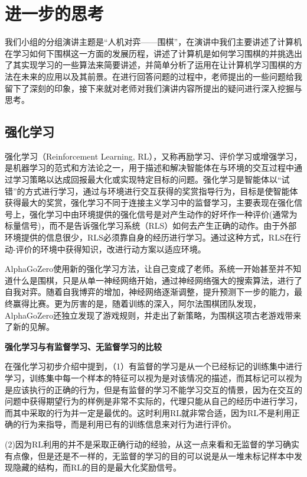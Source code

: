\documentclass{article}
\begin{document}
\section{进一步的思考}
我们小组的分组演讲主题是“人机对弈——围棋”，在演讲中我们主要讲述了计算机在学习如何下围棋这一方面的发展历程，讲述了计算机是如何学习围棋的并挑选出了其实现学习的一些算法来简要讲述，并简单分析了运用在让计算机学习围棋的方法在未来的应用以及其前景。在进行回答问题的过程中，老师提出的一些问题给我留下了深刻的印象，接下来就对老师对我们演讲内容所提出的疑问进行深入挖掘与思考。
\subsection{强化学习}
强化学习（Reinforcement Learning, RL），又称再励学习、评价学习或增强学习，是机器学习的范式和方法论之一，用于描述和解决智能体在与环境的交互过程中通过学习策略以达成回报最大化或实现特定目标的问题。强化学习是智能体以“试错”的方式进行学习，通过与环境进行交互获得的奖赏指导行为，目标是使智能体获得最大的奖赏，强化学习不同于连接主义学习中的监督学习，主要表现在强化信号上，强化学习中由环境提供的强化信号是对产生动作的好坏作一种评价(通常为标量信号)，而不是告诉强化学习系统（RLS）如何去产生正确的动作。由于外部环境提供的信息很少，RLS必须靠自身的经历进行学习。通过这种方式，RLS在行动-评价的环境中获得知识，改进行动方案以适应环境。\par
AlphaGoZero使用新的强化学习方法，让自己变成了老师。系统一开始甚至并不知道什么是围棋，只是从单一神经网络开始，通过神经网络强大的搜索算法，进行了自我对弈。随着自我博弈的增加，神经网络逐渐调整，提升预测下一步的能力，最终赢得比赛。更为厉害的是，随着训练的深入，阿尔法围棋团队发现，AlphaGoZero还独立发现了游戏规则，并走出了新策略，为围棋这项古老游戏带来了新的见解。\par
{\bf 强化学习与有监督学习、无监督学习的比较}\par
在强化学习初步介绍\citep{强化学习初步介绍}中提到，（1）有监督的学习是从一个已经标记的训练集中进行学习，训练集中每一个样本的特征可以视为是对该情况的描述，而其标记可以视为是应该执行的正确的行为，但是有监督的学习不能学习交互的情景，因为在交互的问题中获得期望行为的样例是非常不实际的，代理只能从自己的经历中进行学习，而其中采取的行为并一定是最优的。这时利用RL就非常合适，因为RL不是利用正确的行为来指导，而是利用已有的训练信息来对行为进行评价。\par
(2)因为RL利用的并不是采取正确行动的经验，从这一点来看和无监督的学习确实有点像，但是还是不一样的，无监督的学习的目的可以说是从一堆未标记样本中发现隐藏的结构，而RL的目的是最大化奖励信号。\par
\end{document}
